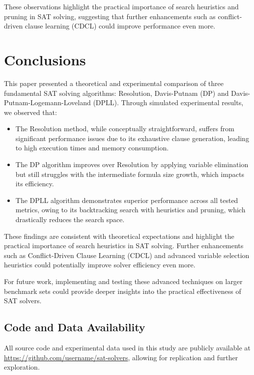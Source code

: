 \documentclass{article}
\begin{document}
These observations highlight the practical importance of search heuristics and pruning in SAT solving, suggesting that further enhancements such as conflict-driven clause learning (CDCL) could improve performance even more.

\section{Conclusions}

This paper presented a theoretical and experimental comparison of three fundamental SAT solving algorithms: Resolution, Davis-Putnam (DP) and Davis-Putnam-Logemann-Loveland (DPLL). Through simulated experimental results, we observed that:

\begin{itemize}
    \item The Resolution method, while conceptually straightforward, suffers from significant performance issues due to its exhaustive clause generation, leading to high execution times and memory consumption.
    \item The DP algorithm improves over Resolution by applying variable elimination but still struggles with the intermediate formula size growth, which impacts its efficiency.
    \item The DPLL algorithm demonstrates superior performance across all tested metrics, owing to its backtracking search with heuristics and pruning, which drastically reduces the search space.
\end{itemize}

These findings are consistent with theoretical expectations and highlight the practical importance of search heuristics in SAT solving. Further enhancements such as Conflict-Driven Clause Learning (CDCL) and advanced variable selection heuristics could potentially improve solver efficiency even more.

For future work, implementing and testing these advanced techniques on larger benchmark sets could provide deeper insights into the practical effectiveness of SAT solvers.

\subsection*{Code and Data Availability}

All source code and experimental data used in this study are publicly available at \url{https://github.com/username/sat-solvers}, allowing for replication and further exploration.
\end{document}
